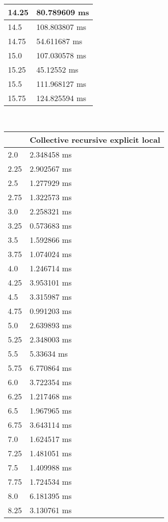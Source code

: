 \begin{multicols}{2}
\begin{tabular}{|l|l|}
		14.25 & 80.789609 ms \\ \hline
		14.5 & 108.803807 ms \\ \hline
		14.75 & 54.611687 ms \\ \hline
		15.0 & 107.030578 ms \\ \hline
		15.25 & 45.12552 ms \\ \hline
		15.5 & 111.968127 ms \\ \hline
		15.75 & 124.825594 ms \\ \hline
	\end{tabular}\\
	\begin{tabular}{|l|l|}
		\hline
		& Collective recursive explicit local \\ \hline
		2.0 & 2.348458 ms \\ \hline
		2.25 & 2.902567 ms \\ \hline
		2.5 & 1.277929 ms \\ \hline
		2.75 & 1.322573 ms \\ \hline
		3.0 & 2.258321 ms \\ \hline
		3.25 & 0.573683 ms \\ \hline
		3.5 & 1.592866 ms \\ \hline
		3.75 & 1.074024 ms \\ \hline
		4.0 & 1.246714 ms \\ \hline
		4.25 & 3.953101 ms \\ \hline
		4.5 & 3.315987 ms \\ \hline
		4.75 & 0.991203 ms \\ \hline
		5.0 & 2.639893 ms \\ \hline
		5.25 & 2.348003 ms \\ \hline
		5.5 & 5.33634 ms \\ \hline
		5.75 & 6.770864 ms \\ \hline
		6.0 & 3.722354 ms \\ \hline
		6.25 & 1.217468 ms \\ \hline
		6.5 & 1.967965 ms \\ \hline
		6.75 & 3.643114 ms \\ \hline
		7.0 & 1.624517 ms \\ \hline
		7.25 & 1.481051 ms \\ \hline
		7.5 & 1.409988 ms \\ \hline
		7.75 & 1.724534 ms \\ \hline
		8.0 & 6.181395 ms \\ \hline
		8.25 & 3.130761 ms \\ \hline

\end{tabular}
\end{multicols}
